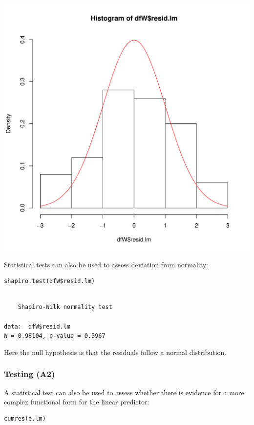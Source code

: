 \documentclass{article}
\begin{document}
\begin{center}
\includegraphics[width=.9\linewidth]{./figures/hist-lm.pdf}
\end{center}

Statistical tests can also be used to assess deviation from normality:
\lstset{language=r,label= ,caption= ,captionpos=b,numbers=none}
\begin{lstlisting}
shapiro.test(dfW$resid.lm)
\end{lstlisting}

\begin{verbatim}

	Shapiro-Wilk normality test

data:  dfW$resid.lm
W = 0.98104, p-value = 0.5967
\end{verbatim}
Here the null hypothesis is that the residuals follow a normal
distribution.

\clearpage

\subsubsection{Testing (A2)}
\label{sec:orga50855a}

A statistical test can also be used to assess whether there is
evidence for a more complex functional form for the linear predictor:
\lstset{language=r,label= ,caption= ,captionpos=b,numbers=none}
\begin{lstlisting}
cumres(e.lm)
\end{lstlisting}
\end{document}

